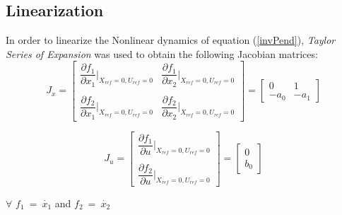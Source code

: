 \documentclass[a4paper,12pt]{article}
\begin{document}
	\subsection{Linearization}
	In order to linearize the Nonlinear dynamics of equation (\ref{invPend}),  \textit{Taylor Series of Expansion} was used to obtain the following Jacobian matrices:
	\begin{equation}	 
		J_x = \begin{bmatrix}
			\dfrac{\partial f_1}{\partial x_1} \biggr \vert_{X_{ref} = 0,U_{ref} = 0} & \dfrac{\partial f_1}{\partial x_2} \biggr \vert_{X_{ref} = 0,U_{ref} = 0}\\ \\
			\dfrac{\partial f_2}{\partial x_1} \biggr \vert_{X_{ref} = 0,U_{ref} = 0} & \dfrac{\partial f_2}{\partial x_2} \biggr \vert_{X_{ref} = 0,U_{ref} = 0}
		\end{bmatrix}
		= \begin{bmatrix}
			0 & 1 \\
			-a_0 & -a_1
		\end{bmatrix}
	\label{stJcb}
	\end{equation}
	
	\begin{equation}
		J_u = \begin{bmatrix}
			\dfrac{\partial f_1}{\partial u} \biggr \vert_{X_{ref} = 0,U_{ref} = 0} \\ \\
			\dfrac{\partial f_2}{\partial u} \biggr \vert_{X_{ref} = 0,U_{ref} = 0} 
		\end{bmatrix}
		= \begin{bmatrix}
			0  \\
			b_0
		\end{bmatrix}
	\label{inpJcb}
	\end{equation}
	
	$\forall$ $f_1 \ = \ \dot{x_1}$ and $f_2 \ = \ \dot{x_2}$ \\
	
\end{document}
